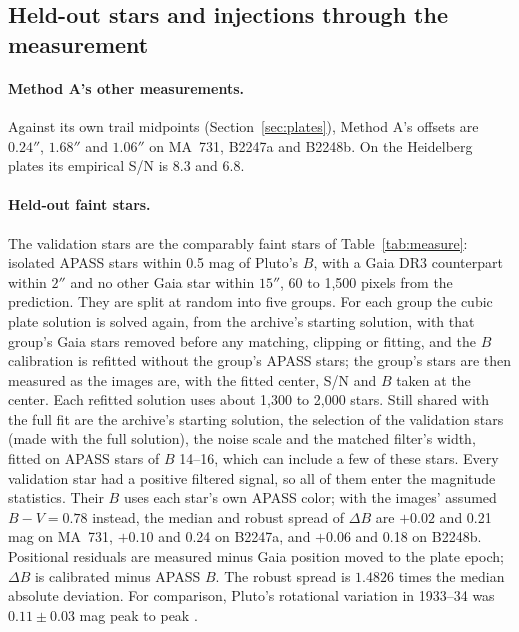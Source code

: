 \documentclass[11pt]{article}
\begin{document}
\begin{appendices}
\section{Held-out stars and injections through the measurement}
\label{app:validation}

\paragraph{Method A's other measurements.} Against its own trail midpoints (Section~\ref{sec:plates}), Method A's offsets are $0.24''$, $1.68''$ and $1.06''$ on MA~731, B2247a and B2248b. On the Heidelberg plates its empirical S/N is 8.3 and 6.8.

\paragraph{Held-out faint stars.} The validation stars are the comparably faint stars of Table~\ref{tab:measure}: isolated APASS stars within 0.5 mag of Pluto's $B$, with a Gaia DR3 counterpart within $2''$ and no other Gaia star within $15''$, 60 to 1,500 pixels from the prediction. They are split at random into five groups. For each group the cubic plate solution is solved again, from the archive's starting solution, with that group's Gaia stars removed before any matching, clipping or fitting, and the $B$ calibration is refitted without the group's APASS stars; the group's stars are then measured as the images are, with the fitted center, S/N and $B$ taken at the center. Each refitted solution uses about 1,300 to 2,000 stars. Still shared with the full fit are the archive's starting solution, the selection of the validation stars (made with the full solution), the noise scale and the matched filter's width, fitted on APASS stars of $B$ 14--16, which can include a few of these stars. Every validation star had a positive filtered signal, so all of them enter the magnitude statistics. Their $B$ uses each star's own APASS color; with the images' assumed $B-V=0.78$ instead, the median and robust spread of $\Delta B$ are $+0.02$ and 0.21 mag on MA~731, $+0.10$ and 0.24 on B2247a, and $+0.06$ and 0.18 on B2248b. Positional residuals are measured minus Gaia position moved to the plate epoch; $\Delta B$ is calibrated minus APASS $B$. The robust spread is $1.4826$ times the median absolute deviation. For comparison, Pluto's rotational variation in 1933--34 was $0.11\pm0.03$ mag peak to peak \cite{Schaefer2008}.


\end{appendices}
\end{document}
